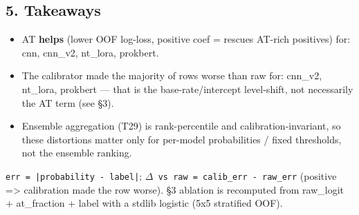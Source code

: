 \documentclass[10pt]{article}
\begin{document}
\begin{center}
\end{center}

\subsection*{5. Takeaways}

\begin{itemize}
\item AT \textbf{helps} (lower OOF log-loss, positive coef = rescues AT-rich positives) for: cnn, cnn\_v2, nt\_lora, prokbert.
\item The calibrator made the majority of rows worse than raw for: cnn\_v2, nt\_lora, prokbert --- that is the base-rate/intercept level-shift, not necessarily the AT term (see \S{}3).
\item Ensemble aggregation (T29) is rank-percentile and calibration-invariant, so these distortions matter only for per-model probabilities / fixed thresholds, not the ensemble ranking.
\end{itemize}

{\footnotesize \texttt{err = |probability - label|}; \texttt{$\Delta$ vs raw = calib\_err - raw\_err} (positive => calibration made the row worse). \S{}3 ablation is recomputed from raw\_logit + at\_fraction + label with a stdlib logistic (5x5 stratified OOF).}
\end{document}
